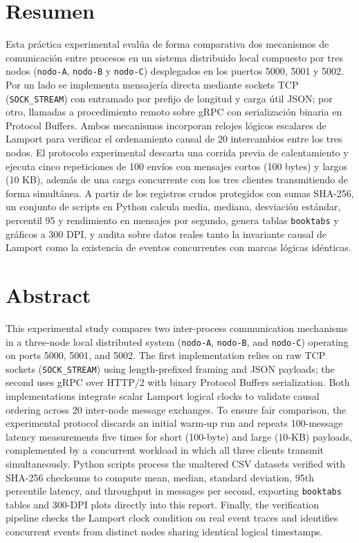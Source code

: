 \documentclass[12pt,a4paper]{article}
\begin{document}
\section*{Resumen}

Esta práctica experimental evalúa de forma comparativa dos mecanismos de comunicación entre procesos en un sistema distribuido local compuesto por tres nodos (\texttt{nodo-A}, \texttt{nodo-B} y \texttt{nodo-C}) desplegados en los puertos 5000, 5001 y 5002. Por un lado se implementa mensajería directa mediante sockets TCP (\texttt{SOCK\_STREAM}) con entramado por prefijo de longitud y carga útil JSON; por otro, llamadas a procedimiento remoto sobre gRPC con serialización binaria en Protocol Buffers. Ambos mecanismos incorporan relojes lógicos escalares de Lamport para verificar el ordenamiento causal de 20 intercambios entre los tres nodos. El protocolo experimental descarta una corrida previa de calentamiento y ejecuta cinco repeticiones de 100 envíos con mensajes cortos (100 bytes) y largos (10 KB), además de una carga concurrente con los tres clientes transmitiendo de forma simultánea. A partir de los registros crudos protegidos con sumas SHA-256, un conjunto de scripts en Python calcula media, mediana, desviación estándar, percentil 95 y rendimiento en mensajes por segundo, genera tablas \texttt{booktabs} y gráficos a 300 DPI, y audita sobre datos reales tanto la invariante causal de Lamport como la existencia de eventos concurrentes con marcas lógicas idénticas.

\section*{Abstract}

This experimental study compares two inter-process communication mechanisms in a three-node local distributed system (\texttt{nodo-A}, \texttt{nodo-B}, and \texttt{nodo-C}) operating on ports 5000, 5001, and 5002. The first implementation relies on raw TCP sockets (\texttt{SOCK\_STREAM}) using length-prefixed framing and JSON payloads; the second uses gRPC over HTTP/2 with binary Protocol Buffers serialization. Both implementations integrate scalar Lamport logical clocks to validate causal ordering across 20 inter-node message exchanges. To ensure fair comparison, the experimental protocol discards an initial warm-up run and repeats 100-message latency measurements five times for short (100-byte) and large (10-KB) payloads, complemented by a concurrent workload in which all three clients transmit simultaneously. Python scripts process the unaltered CSV datasets verified with SHA-256 checksums to compute mean, median, standard deviation, 95th percentile latency, and throughput in messages per second, exporting \texttt{booktabs} tables and 300-DPI plots directly into this report. Finally, the verification pipeline checks the Lamport clock condition on real event traces and identifies concurrent events from distinct nodes sharing identical logical timestamps.
\end{document}
